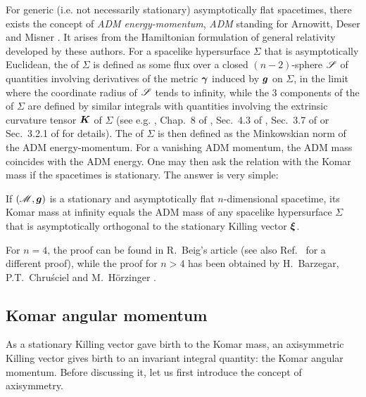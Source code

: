 For generic (i.e. not necessarily stationary) asymptotically flat spacetimes,
there exists the concept of \emph{ADM energy-momentum}, \emph{ADM} standing for
Arnowitt, Deser and Misner \cite{ArnowDM62}. It arises from the Hamiltonian
formulation of general relativity developed by these authors.
For a spacelike hypersurface $\Sigma$ that is asymptotically Euclidean,
the  of $\Sigma$ is defined
as some flux over a closed $(n-2)$-sphere $\mathscr{S}$ of quantities involving derivatives
of the metric $\bm{\gamma}$ induced by $\bm{g}$ on $\Sigma$, in the limit where
the coordinate radius of $\mathscr{S}$ tends to infinity, while the
3 components of the 
of $\Sigma$ are defined by similar integrals with quantities involving the extrinsic curvature
tensor $\bm{K}$ of $\Sigma$ (see e.g. \cite{JaramG11},
Chap.~8 of \cite{Gourg12}, Sec.~4.3 of \cite{Poiss04},
Sec.~3.7 of \cite{Strau13} or Sec.~3.2.1 of \cite{Szaba09} for details).
The  of $\Sigma$
is then defined as the Minkowskian norm of the ADM energy-momentum.
For a vanishing ADM momentum, the ADM mass coincides with the ADM energy.
One may then ask the relation with the Komar mass if the spacetimes is stationary.
The answer is very simple:
\begin{prop}
If $(\mathscr{M},\bm{g})$ is a stationary and asymptotically flat $n$-dimensional spacetime,
its Komar mass at infinity equals the ADM mass of any spacelike hypersurface
$\Sigma$ that is asymptotically orthogonal to the stationary Killing vector $\bm{\xi}$.
\end{prop}
For $n=4$, the proof can be found in R.~Beig's article \cite{Beig78}
(see also Ref.~\cite{AshteM79} for a different proof), while the proof
for $n>4$ has been obtained by H.~Barzegar, P.T.~Chruściel and M.~Hörzinger \cite{BarzgCH17}.

\subsection{Komar angular momentum} \label{s:sta:Komar_angu_mom}

As a stationary Killing vector gave birth to the Komar mass,
an axisymmetric Killing vector gives birth to an invariant integral quantity:
the Komar angular momentum. Before discussing it, let us first introduce
the concept of axisymmetry.

